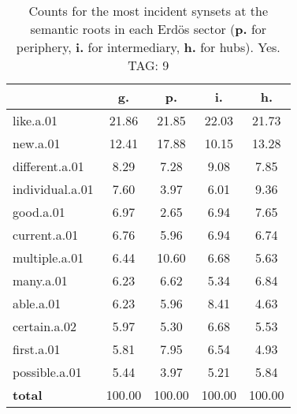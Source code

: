 \begin{table}[h!]
\begin{center}
\begin{tabular}{| l | c | c | c | c |}\hline
 & g. & p. & i. & h. \\\hline
like.a.01 & 21.86  & 21.85  & 22.03  & 21.73 \\\hline
new.a.01 & 12.41  & 17.88  & 10.15  & 13.28 \\\hline
different.a.01 & 8.29  & 7.28  & 9.08  & 7.85 \\\hline
individual.a.01 & 7.60  & 3.97  & 6.01  & 9.36 \\\hline
good.a.01 & 6.97  & 2.65  & 6.94  & 7.65 \\\hline
current.a.01 & 6.76  & 5.96  & 6.94  & 6.74 \\\hline
multiple.a.01 & 6.44  & 10.60  & 6.68  & 5.63 \\\hline
many.a.01 & 6.23  & 6.62  & 5.34  & 6.84 \\\hline
able.a.01 & 6.23  & 5.96  & 8.41  & 4.63 \\\hline
certain.a.02 & 5.97  & 5.30  & 6.68  & 5.53 \\\hline
first.a.01 & 5.81  & 7.95  & 6.54  & 4.93 \\\hline
possible.a.01 & 5.44  & 3.97  & 5.21  & 5.84 \\\hline
{{\bf total}} & 100.00  & 100.00  & 100.00  & 100.00 \\\hline
\end{tabular}
\caption{Counts for the most incident synsets at the semantic roots in each Erd\"os sector ({\bf p.} for periphery, {\bf i.} for intermediary, {\bf h.} for hubs). Yes. TAG: 9}
\end{center}
\end{table}